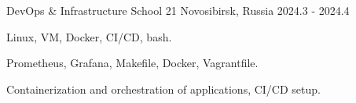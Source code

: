 \begin{cventries}
  \cventry
    {DevOps \& Infrastructure} %
    {School 21} %
    {Novosibirsk, Russia} %
    {2024.3 - 2024.4} %
    {
      \begin{cvitems} %
        \item {Linux, VM, Docker, CI/CD, bash.}
        \item {Prometheus, Grafana, Makefile, Docker, Vagrantfile.}
        \item {Containerization and orchestration of applications, CI/CD setup.}
      \end{cvitems}
    }

\end{cventries}


\newpage



